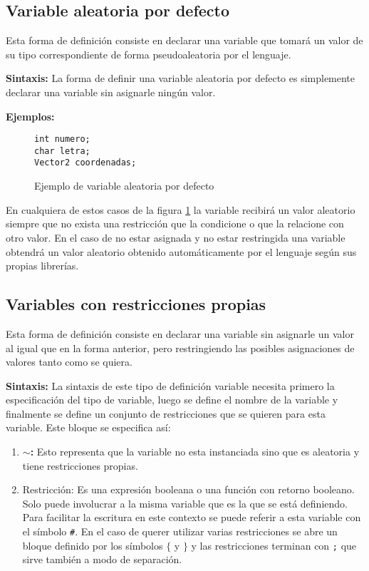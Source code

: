 \subsection{Variable aleatoria por defecto}
\label{var:aleatoria_por_defecto}
Esta forma de definición consiste en declarar una variable que tomará un valor 
de su tipo correspondiente de forma pseudoaleatoria por el lenguaje.
	
\textbf{Sintaxis:} La forma de definir una variable aleatoria por defecto es 
simplemente declarar una variable sin asignarle ningún valor. 
	
\textbf{Ejemplos:}
\begin{figure}[h]
\begin{lstlisting}[mathescape]
int numero;
char letra;
Vector2 coordenadas;
\end{lstlisting}
\caption[Ejemplo de variable aleatoria por defecto]
{Ejemplo de variable aleatoria por defecto}
\label{ejemplo_variable_aleatoria_por_defecto}
\end{figure}

En cualquiera de estos casos de la figura \ref{ejemplo_variable_aleatoria_por_defecto} 
la variable recibirá un valor aleatorio siempre que no exista una restricción que 
la condicione o que la relacione con otro valor.
En el caso de no estar asignada y no estar restringida una variable obtendrá un 
valor aleatorio obtenido automáticamente por el lenguaje según sus propias librerías.
		
\subsection{Variables con restricciones propias}
\label{var:restricciones_propias}
Esta forma de definición consiste en declarar una variable sin asignarle un valor
al igual que en la forma anterior, pero restringiendo las posibles asignaciones 
de valores tanto como se quiera.

\textbf{Sintaxis:} La sintaxis de este tipo de definición variable necesita primero 
  la especificación del tipo de variable, luego se define el nombre de la variable 
  y finalmente se define un conjunto de restricciones que se quieren para esta 
  variable. Este bloque se especifica así:
	\begin{enumerate}
    \item {\textbf{$\sim$:} Esto representa que la variable no esta 
      instanciada sino que es aleatoria y tiene restricciones propias.}
    \item {Restricción: Es una expresión booleana o una función con retorno 
      booleano. Solo puede involucrar a la misma variable que es la que se está 
      definiendo. Para facilitar la escritura en este contexto se puede referir 
      a esta variable con el símbolo \texttt{\#}. En el caso de querer utilizar varias
      restricciones se abre un bloque definido por los símbolos \texttt{$\lbrace$} 
      y  \texttt{$\rbrace$} y las restricciones terminan con \texttt{;} que sirve 
      también a modo de separación.}
	\end{enumerate}

